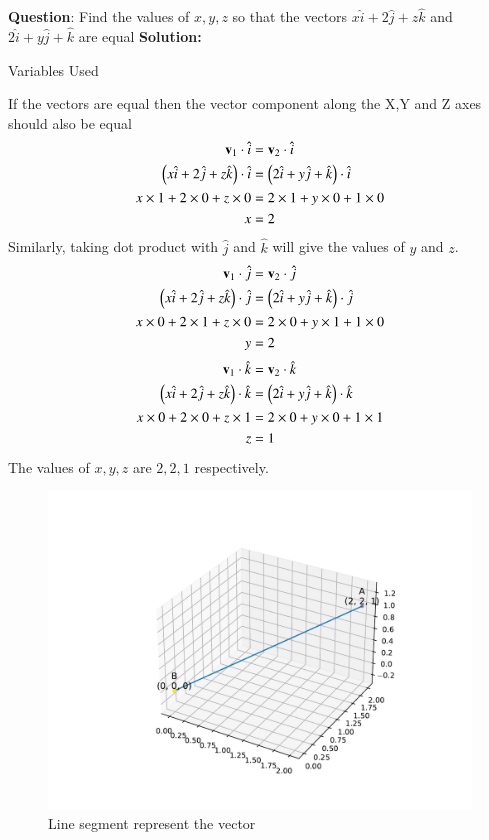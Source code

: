 \documentclass[journal]{IEEEtran}
\begin{document}
\textbf{Question}:\newline
Find the values of $x,y,z$ so that the vectors $x\hat{i}+2\hat{j}+z\hat{k}$ and $2\hat{i}+y\hat{j}+\hat{k}$ are equal
\newline
\textbf{Solution: }
\begin{table}[h!]    
  \centering
  
  \caption{Variables Used}
  \label{tab1.1.2.2}
\end{table}
\newline
If the vectors are equal then the vector component along the X,Y and Z axes should also be equal
\begin{align}
\mathbf{v}_1\cdot \hat{i} &= \mathbf{v}_2\cdot \hat{i}\\
\left(x\hat{i}+2\hat{j}+z\hat{k}\right) \cdot \hat{i} &= \left(2\hat{i}+y\hat{j}+\hat{k}\right) \cdot \hat{i}\\
x\times 1+2\times 0+ z\times 0&=2\times 1+y\times 0+ 1\times 0\\
x&=2
\end{align}
Similarly, taking dot product with $\hat{j}$ and $\hat{k}$ will give the values of $y$ and $z$.\\
\begin{align}
\mathbf{v}_1\cdot \hat{j} &= \mathbf{v}_2\cdot \hat{j}\\
\left(x\hat{i}+2\hat{j}+z\hat{k}\right) \cdot \hat{j} &= \left(2\hat{i}+y\hat{j}+\hat{k}\right) \cdot \hat{j}\\
x\times 0+2\times 1+ z\times 0&=2\times 0+y\times 1+ 1\times 0\\
y&=2
\end{align}
\begin{align}
\mathbf{v}_1\cdot \hat{k} &= \mathbf{v}_2\cdot \hat{k}\\
\left(x\hat{i}+2\hat{j}+z\hat{k}\right) \cdot \hat{k} &= \left(2\hat{i}+y\hat{j}+\hat{k}\right) \cdot \hat{k}\\
x\times 0+2\times 0+ z\times 1&=2\times 0+y\times 0+ 1\times 1\\
z&=1
\end{align}
The values of $x,y,z$ are $2,2,1$ respectively.
\begin{figure}[h!]
   \centering
   \includegraphics[width=1\linewidth]{figs/fig.pdf}
   \caption{Line segment represent the vector}
   \label{stemplot}
\end{figure}
\end{document}
